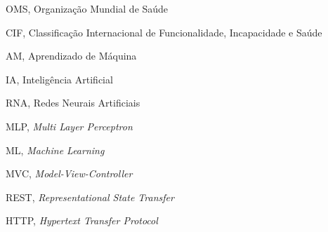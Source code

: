 \begin{siglas}
  \item OMS, Organização Mundial de Saúde
  \item CIF, Classificação Internacional de Funcionalidade, Incapacidade e Saúde
  \item AM, Aprendizado de Máquina
  \item IA, Inteligência Artificial
  \item RNA, Redes Neurais Artificiais
  \item MLP, \textit{Multi Layer Perceptron}
  \item ML, \textit{Machine Learning}
  \item MVC, \textit{Model-View-Controller}
  \item REST, \textit{Representational State Transfer}
  \item HTTP, \textit{Hypertext Transfer Protocol}
\end{siglas}
